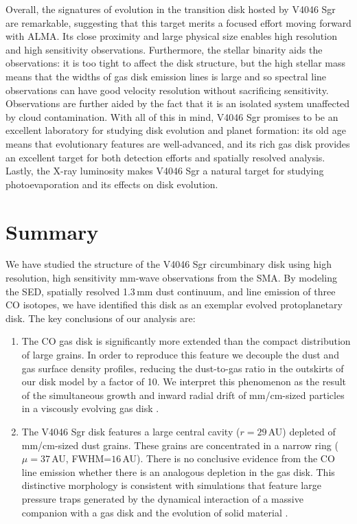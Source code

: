 {Overall, the signatures of evolution in the transition disk hosted by V4046 Sgr
are remarkable, suggesting that this target merits a focused effort moving 
forward with ALMA.  Its close proximity and large physical size enables high 
resolution and high sensitivity observations.  Furthermore, the stellar 
binarity aids the observations: it is too tight to affect the disk structure, 
but the high stellar mass means that the widths of gas disk emission lines is 
large and so spectral line observations can have good velocity resolution 
without sacrificing sensitivity.  Observations are further aided by the fact 
that it is an isolated system unaffected by cloud contamination.  With all of 
this in mind, V4046 Sgr promises to be an excellent laboratory for studying disk
evolution and planet formation: its old age means that evolutionary features are
well-advanced, and its rich gas disk provides an excellent target for both 
detection efforts and spatially resolved analysis.  Lastly, the X-ray luminosity
makes V4046 Sgr a natural target for studying photoevaporation and its effects 
on disk evolution.  

\section{Summary}

We have studied the structure of the V4046 Sgr circumbinary disk using high 
resolution, high sensitivity mm-wave observations from the SMA.  By modeling the
SED, spatially resolved 1.3\,mm dust continuum, and line emission of three CO 
isotopes, we have identified this disk as an exemplar evolved protoplanetary 
disk.  The key conclusions of our analysis are:

\begin{enumerate}
\item The CO gas disk is significantly more extended than the compact 
distribution of large grains.  In order to reproduce this feature we decouple 
the dust and gas surface density profiles, reducing the dust-to-gas ratio in the
outskirts of our disk model by a factor of 10.  We interpret this phenomenon as 
the result of the simultaneous growth and inward radial drift of mm/cm-sized 
particles in a viscously evolving gas disk \citep{birnstiel12a}.

\item The V4046 Sgr disk features a large central cavity ($r=29$\,AU) depleted 
of mm/cm-sized dust grains.  These grains are concentrated in a narrow ring 
($\mu=37$\,AU, FWHM=$16$\,AU).  There is no conclusive evidence from the CO 
line emission whether there is an analogous depletion in the gas disk. This 
distinctive morphology is consistent with simulations that feature large 
pressure traps generated by the dynamical interaction of a massive companion 
with a gas disk and the evolution of solid material \citep{pinilla12a}.  


\end{enumerate}}
